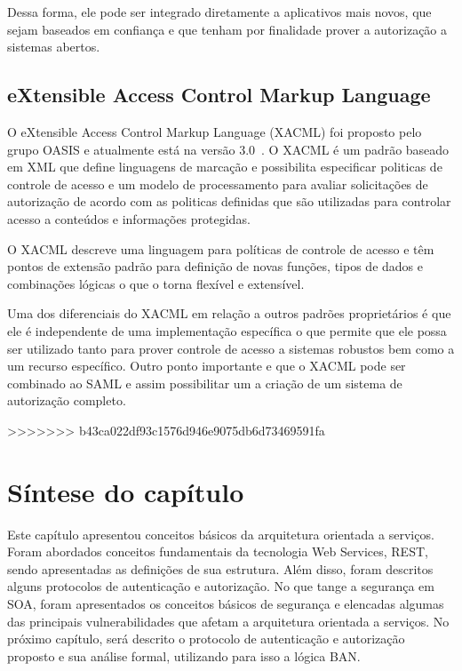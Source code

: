 Dessa forma, ele pode ser integrado diretamente a aplicativos mais novos, que sejam baseados em confiança e que tenham por finalidade  prover a autorização a sistemas abertos.

\subsection{eXtensible Access Control Markup Language}
O eXtensible Access Control Markup Language (XACML) foi proposto pelo grupo OASIS e atualmente está na versão 3.0~\cite{XACML}. O XACML é um padrão baseado em XML que define linguagens de marcação e possibilita especificar politicas de controle de acesso e um modelo de processamento para avaliar solicitações de autorização de acordo com as politicas definidas que são utilizadas para controlar acesso a conteúdos e informações protegidas.

O XACML descreve uma linguagem para políticas de controle de acesso e têm pontos de extensão padrão para definição de novas funções, tipos de dados e combinações lógicas o que o torna flexível e extensível.

Uma dos diferenciais do XACML em relação a outros padrões proprietários é que ele é independente de uma implementação específica o que permite que ele possa ser utilizado tanto para prover controle de acesso a sistemas robustos bem como a um recurso específico. Outro ponto importante e que o XACML pode ser combinado ao SAML e assim possibilitar um a criação de um sistema de autorização completo.



>>>>>>> b43ca022df93c1576d946e9075db6d73469591fa

\section{Síntese do capítulo}

Este capítulo apresentou conceitos básicos da arquitetura orientada a serviços. Foram abordados conceitos fundamentais da tecnologia Web Services, REST, sendo apresentadas as definições de sua estrutura. Além disso, foram descritos alguns protocolos de autenticação e autorização. No que tange a segurança em SOA, foram apresentados os conceitos básicos de segurança e elencadas algumas das principais vulnerabilidades que afetam a arquitetura orientada a serviços. No próximo capítulo, será descrito o protocolo de autenticação e autorização proposto e sua análise formal, utilizando para isso a lógica BAN.
